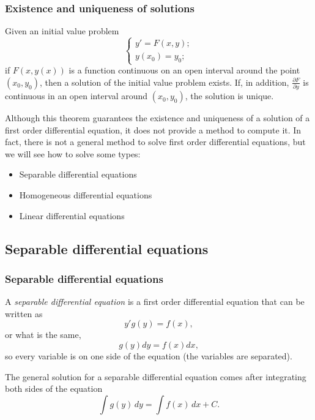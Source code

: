 \begin{frame}
\frametitle{Existence and uniqueness of solutions}
\begin{theorem}
Given an initial value problem 
\[
\begin{cases}
y'=F(x,y);\\
y(x_0)=y_0;
\end{cases}
\]
if $F(x,y(x))$ is a function continuous on an open interval around the point $(x_0,y_0)$, then a solution of the initial value problem exists. 
If, in addition, $\frac{\partial F}{\partial y}$ is continuous in an open interval around $(x_0,y_0)$, the solution is unique. 
\end{theorem}

Although this theorem guarantees the existence and uniqueness of a solution of a first order differential equation, it does not provide a method to compute it. 
In fact, there is not a general method to solve first order differential equations, but we will see how to solve some types:
\begin{itemize}
\item Separable differential equations
\item Homogeneous differential equations
\item Linear differential equations
\end{itemize}
\end{frame}



\subsection{Separable differential equations}
\begin{frame}
\frametitle{Separable differential equations}
\begin{definition}
A \emph{separable differential equation} is a first order differential equation that can be written as
\[y'g(y)=f(x),\]
or what is the same,
\[g(y)dy=f(x)dx,\]
so every variable is on one side of the equation (the variables are separated).
\end{definition}

The general solution for a separable differential equation comes after integrating both sides of the equation
\[\int g(y)\,dy = \int f(x)\,dx+C.\]
\end{frame}


